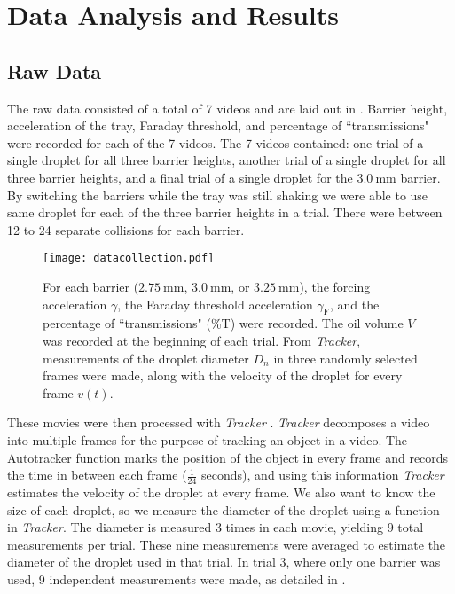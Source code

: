 \chapter{Data Analysis and Results}



\section{Raw Data}
The raw data consisted of a total of 7 videos and are laid out in . Barrier height, acceleration of the tray, Faraday threshold, and percentage of ``transmissions" were recorded for each of the 7 videos. The 7 videos contained: one trial of a single droplet for all three barrier heights, another trial of a single droplet for all three barrier heights, and a final trial of a single droplet for the $3.0~\mathrm{mm}$ barrier. By switching the barriers while the tray was still shaking we were able to use same droplet for each of the three barrier heights in a trial. There were between 12 to 24 separate collisions for each barrier. 

\begin{figure}[h!]
	\centering
	\texttt{[image: datacollection.pdf]}
	\caption{For each barrier ($2.75~\mathrm{mm}$, $3.0~\mathrm{mm}$, or $3.25~\mathrm{mm}$), the forcing acceleration $\gamma$, the Faraday threshold acceleration $\gamma_\mathrm{F}$, and the percentage of ``transmissions" (\%T) were recorded. The oil volume $V$ was recorded at the beginning of each trial. From \textit{Tracker}, measurements of the droplet diameter $D_n$ in three randomly selected frames were made, along with the velocity of the droplet for every frame $v(t)$.}
	\label{datacollection}
\end{figure}

These movies were then processed with \textit{Tracker} \cite{tracker}. \textit{Tracker} decomposes a video into multiple frames for the purpose of tracking an object in a video. The Autotracker function marks the position of the object in every frame and records the time in between each frame ($\frac{1}{24}$ seconds), and using this information \textit{Tracker} estimates the velocity of the droplet at every frame. We also want to know the size of each droplet, so we measure the diameter of the droplet using a function in \textit{Tracker}. The diameter is measured 3 times in each movie, yielding 9 total measurements per trial. These nine measurements were averaged to estimate the diameter of the droplet used in that trial. In trial 3, where only one barrier was used, 9 independent measurements were made, as detailed in .

